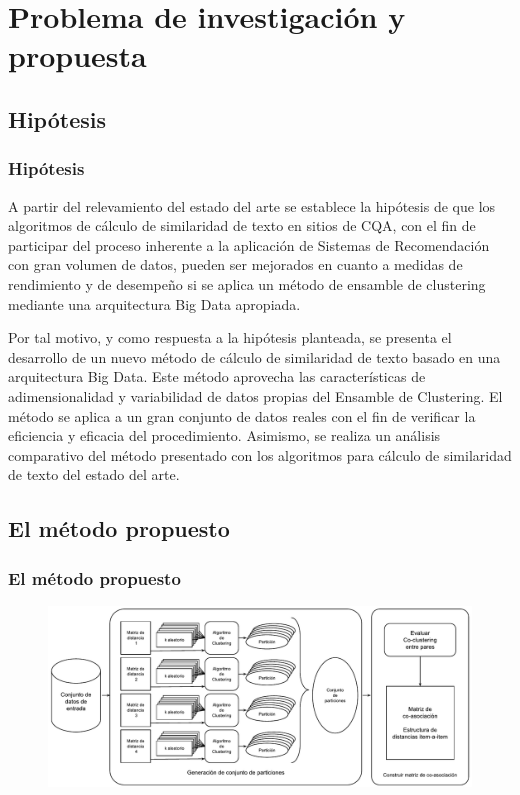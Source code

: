 \section{Problema de investigación y propuesta}

\subsection{Hipótesis}
\begin{frame}
	\frametitle{Hipótesis}
	A partir del relevamiento del estado del arte se establece la hipótesis de que los algoritmos de cálculo de similaridad de texto en sitios de CQA, con el fin de participar del proceso inherente a la aplicación de Sistemas de Recomendación con gran volumen de datos, pueden ser mejorados en cuanto a medidas de rendimiento y de desempeño si se aplica un método de ensamble de clustering mediante una arquitectura Big Data apropiada.

	\bigskip Por tal motivo, y como respuesta a la hipótesis planteada, se presenta el desarrollo de un nuevo método de cálculo de similaridad de texto basado en una arquitectura Big Data. Este método aprovecha las características de adimensionalidad y variabilidad de datos propias del Ensamble de Clustering. El método se aplica a un gran conjunto de datos reales con el fin de verificar la eficiencia y eficacia del procedimiento. Asimismo, se realiza un análisis comparativo del método presentado con los algoritmos para cálculo de similaridad de texto del estado del arte.
\end{frame}

\subsection{El método propuesto}
\begin{frame}
	\frametitle{El método propuesto}
	\begin{figure}
		\centering
		\includegraphics[width=0.9\linewidth]{../8_problema_investigacion/imagenes/metodo_equal}
		\label{fig:metodoequal}
	\end{figure}
\end{frame}

